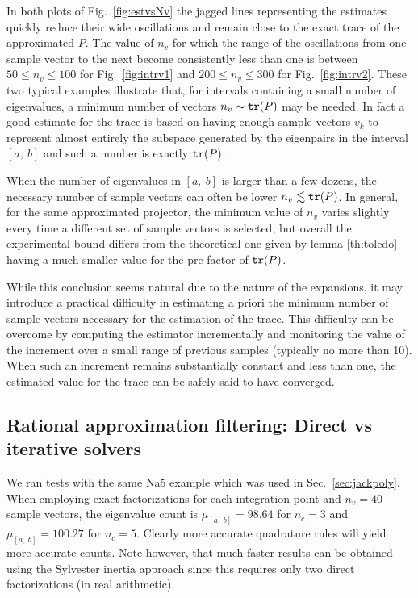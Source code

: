 \documentclass[12pt]{article}		\usepackage{tabls,multirow}
\def\trace{\mbox{\tt tr}}
\newcommand{\ab}{[a, \ b]}
\begin{document}
In both plots of Fig.~\ref{fig:estvsNv} the jagged lines representing
the estimates quickly reduce their wide oscillations and remain close
to the exact trace of the approximated $P$. The value of $n_v$ for
which the range of the oscillations from one sample vector to the next
become consistently less than one is between $50 \leq n_v \leq 100$
for Fig.~\ref{fig:intrv1} and $200 \leq n_v \leq 300$ for
Fig.~\ref{fig:intrv2}. These two typical examples illustrate that, for
intervals containing a small number of eigenvalues, a minimum number
of vectors $n_v \sim \trace(P)$ may be needed. In fact a good estimate
for the trace is based on having enough sample vectors $v_k$ to
represent almost entirely the subspace generated by the eigenpairs in
the interval $\ab$ and such a number is exactly $\trace(P)$.

When the number of eigenvalues in $\ab$ is larger than a few dozens,
the necessary number of sample vectors can often be lower $n_v
\lesssim \trace(P)$.  In general, for the same approximated projector,
the minimum value of $n_v$ varies slightly every time a different set
of sample vectors is selected, but overall the experimental bound
differs from the theoretical one given by lemma \ref{th:toledo} having
a much smaller value for the pre-factor of $\trace(P)$.

While this conclusion seems natural due to the nature of the
expansions, it may introduce a practical difficulty in estimating a
priori the minimum number of sample vectors necessary for the
estimation of the trace. This difficulty can be overcome by computing
the estimator incrementally and monitoring the value of the increment
over a small range of previous samples (typically no more than 10).
When such an increment remains substantially constant and less than
one, the estimated value for the trace can be safely said to have
converged.


\subsection{Rational approximation filtering: Direct vs iterative solvers}
\label{sec:dvsi}
We ran tests with the same Na5 example which was used in
Sec.~\ref{sec:jackpoly}.  When employing exact factorizations for each
integration point and $n_v=40$ sample vectors, the eigenvalue count is
$\mu_{\ab} = 98.64$ for $n_c = 3$ and $\mu_{\ab} = 100.27$ for
$n_c = 5$. Clearly more accurate quadrature rules will yield
more accurate counts.  Note however, that much faster results can be
obtained using the Sylvester inertia approach since this requires
only two direct factorizations (in real arithmetic).
\end{document}
